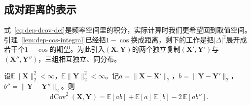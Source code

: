 \subsection{成对距离的表示}
\label{sec:dep-dcov-pairwise}

式~\eqref{eq:dep-dcov-def}是频率空间里的积分，实际计算时我们更希望回到取值空间。引理~\ref{lem:dep-cos-integral}已经把$1-\cos$换成距离，剩下的工作是把$\lvert\Delta\rvert^{2}$展开成若干个$1-\cos$的期望。为此引入$(\bm{X},\bm{Y})$的两个独立复制$(\bm{X}',\bm{Y}')$与$(\bm{X}'',\bm{Y}'')$，三组相互独立、同分布。

\begin{theorem}[距离协方差的成对距离表示]
\label{thm:dep-dcov-pairwise}
设$\mathbb{E}\lVert\bm{X}\rVert_2^{2}<\infty$，$\mathbb{E}\lVert\bm{Y}\rVert_2^{2}<\infty$。记$a=\lVert\bm{X}-\bm{X}'\rVert_2$，$b=\lVert\bm{Y}-\bm{Y}'\rVert_2$，$b''=\lVert\bm{Y}-\bm{Y}''\rVert_2$。则
\begin{equation}
  \operatorname{dCov}^{2}(\bm{X},\bm{Y})=\mathbb{E}[ab]+\mathbb{E}[a]\,\mathbb{E}[b]-2\,\mathbb{E}[ab''] .
  \label{eq:dep-dcov-pairwise}
\end{equation}
\end{theorem}

